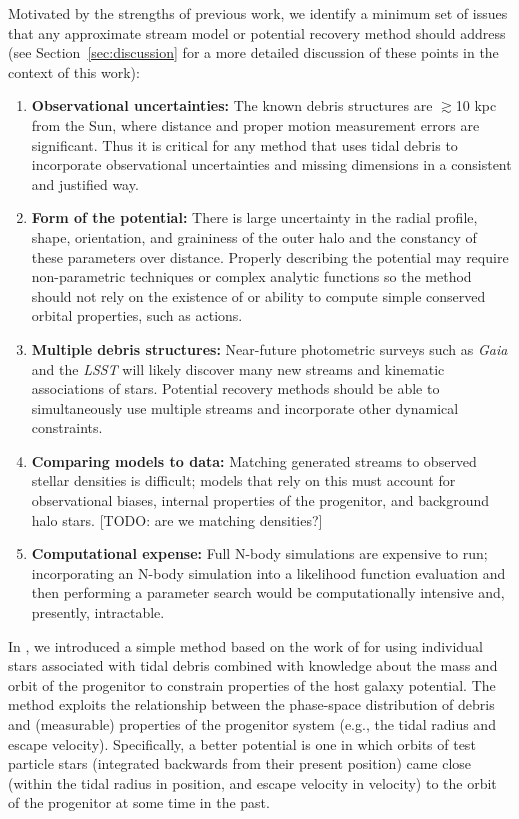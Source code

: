 \documentclass[letterpaper,12pt,preprint]{aastex}
\newcommand{\project}[1]{\textsl{#1}}
\newcommand{\gaia}{\project{Gaia}}
\begin{document}
Motivated by the strengths of previous work, we identify a minimum set of issues that any approximate stream model or potential recovery method should address (see Section~\ref{sec:discussion} for a more detailed discussion of these points in the context of this work):
\begin{enumerate}
	\item \textbf{Observational uncertainties:} The known debris structures are $\gtrsim$10 kpc from the Sun, where distance and proper motion measurement errors are significant. Thus it is critical for any method that uses tidal debris to incorporate observational uncertainties and missing dimensions in a consistent and justified way. 
	\item \textbf{Form of the potential:} There is large uncertainty in the radial profile, shape, orientation, and graininess of the outer halo and the constancy of these parameters over distance. Properly describing the potential may require non-parametric techniques or complex analytic functions so the method should not rely on the existence of or ability to compute simple conserved orbital properties, such as actions.
	\item \textbf{Multiple debris structures:} Near-future photometric surveys such as \gaia\, and the \project{LSST} will likely discover many new streams and kinematic associations of stars. Potential recovery methods should be able to simultaneously use multiple streams and incorporate other dynamical constraints.
	\item \textbf{Comparing models to data:} Matching generated streams to observed stellar densities is difficult; models that rely on this must account for observational biases, internal properties of the progenitor, and background halo stars. [TODO: are we matching densities?]
	\item \textbf{Computational expense:} Full N-body simulations are expensive to run; incorporating an N-body simulation into a likelihood function evaluation and then performing a parameter search would be computationally intensive and, presently, intractable.
\end{enumerate}

In \citet{apw13}, we introduced a simple method based on the work of \citet{johnston99a} for using individual stars associated with tidal debris combined with knowledge about the mass and orbit of the progenitor to constrain properties of the host galaxy potential. The method exploits the relationship between the phase-space distribution of debris and (measurable) properties of the progenitor system (e.g., the tidal radius and escape velocity).  Specifically, a better potential is one in which orbits of test particle stars (integrated backwards from their present position) came close (within the tidal radius in position, and escape velocity in velocity) to the orbit of the progenitor at some time in the past. 
\end{document}
